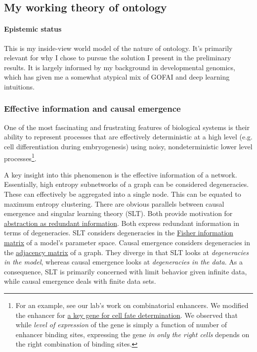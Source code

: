 \subsection{My working theory of ontology}
\paragraph{Epistemic status}
This is my inside-view world model of the nature of ontology.
It's primarily relevant for why I chose to pursue the solution I present in the preliminary results.
It is largely informed by my background in developmental genomics,
which has given me a somewhat atypical mix of GOFAI and deep learning intuitions.

\subsubsection{Effective information and causal emergence}
One of the most fascinating and frustrating features of biological systems is their ability to
represent processes that are effectively deterministic at a high level 
(e.g. cell differentiation during embryogenesis)
using noisy, nondeterministic lower level processes\footnote{
For an example, see our lab's work on combinatorial enhancers\cite{10.7554/eLife.49921}.
We modified the enhancer for \hyperlink{https://aniseed.fr/aniseed/gene/show_gene?unique_id=Cirobu.g00012207&module=aniseed&action=gene:show_gene}{a key gene for cell fate determination}.
We observed that while \textit{level of expression} of the gene is simply a 
function of number of enhancer binding sites, 
expressing the gene \textit{in only the right cells} depends on the right combination of binding sites.
}.

A key insight into this phenomenon is the effective information\cite{klein2020emergence} of a network.
Essentially, high entropy subnetworks of a graph can be considered degeneracies.
These can effectively be aggregated into a single node. 
This can be equated to maximum entropy clustering\cite{e17010151}.
There are obvious parallels between causal emergence and singular learning theory (SLT).
Both provide motivation for
\hyperlink{https://www.lesswrong.com/posts/vvEebH5jEvxnJEvBC/abstractions-as-redundant-information}{abstraction as redundant information}.
Both express redundant information in terms of degeneracies. SLT considers degeneracies in the
\hyperlink{https://en.wikipedia.org/wiki/Fisher_information}{Fisher information matrix}
of a model's parameter space.
Causal emergence considers degeneracies in the 
\hyperlink{https://en.wikipedia.org/wiki/Adjacency_matrix}{adjacency matrix} of a graph.
They diverge in that SLT looks at \textit{degeneracies in the model},
whereas causal emergence looks at \textit{degeneracies in the data}.
As a consequence, SLT is primarily concerned with limit behavior given infinite data,
while causal emergence deals with finite data sets.

